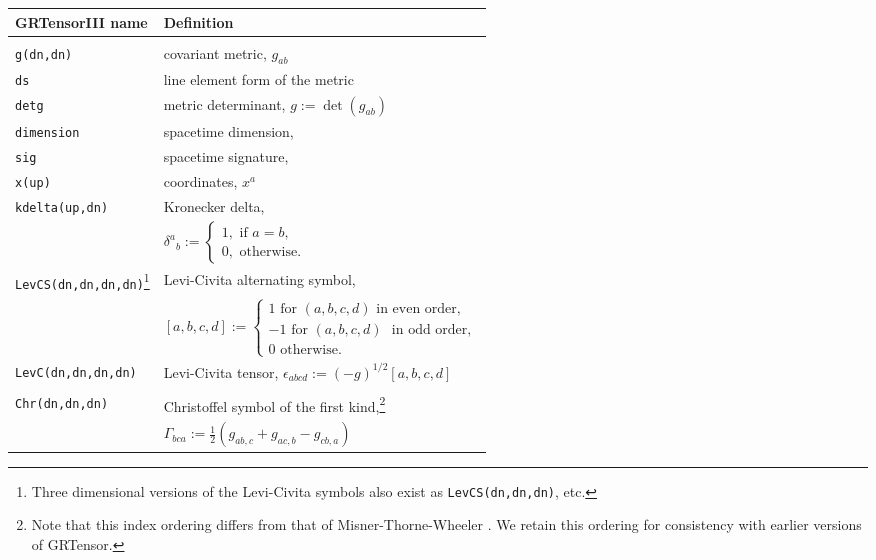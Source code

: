 \documentclass{article}
\begin{document}
{{{\renewcommand{\baselinestretch}{1.5}\normalsize
\begin{longtable}[c]{lp{}}\hline\hline
GRTensorIII name & Definition\\ \hline
& \\
\texttt{g(dn,dn)}	& covariant metric, $g_{ab}$\\
\texttt{ds}		& line element form of the metric\\
\texttt{detg}		& metric determinant, $g := \det (g_{ab})$\\
\texttt{dimension}	& spacetime dimension,\\
\texttt{sig}		& spacetime signature,\\
\texttt{x(up)}		& coordinates, $x^a$\\
%
\texttt{kdelta(up,dn)}	& Kronecker delta, \\ 
			& $\delta^a{}_b :=
			    \left\{
			      \begin{array}{l}
			        1, \text{~if~} a=b,\\
			        0, \text{~otherwise.}
			      \end{array}
			    \right. $ \\
\texttt{LevCS(dn,dn,dn,dn)}\footnote{Three dimensional versions of the
Levi-Civita symbols also exist as \texttt{LevCS(dn,dn,dn)}, etc.}
			& Levi-Civita alternating symbol,\\
			& $ [a,b,c,d] :=
			    \left\{
			      \begin{array}{l}
				1 \text{~for~}(a,b,c,d)
				\text{~in even order}, \\
			        -1 \text{~for~} (a,b,c,d)
				\text{~ in odd order},\\
				0 \text{~otherwise.}
			      \end{array}
			    \right. $ \\
\texttt{LevC(dn,dn,dn,dn)} & Levi-Civita tensor, 
			$\epsilon_{abcd} := (-g)^{1/2}[a,b,c,d]$\\
& \\
%
\texttt{Chr(dn,dn,dn)}	& Christoffel symbol of the first 
			  kind,\footnote{
			  \parbox[t]{\textwidth}{
			  \renewcommand{\baselinestretch}{1}\small
			  Note that this index ordering
			  differs from that of Misner-Thorne-Wheeler
			  \cite{mtw}. 
			  We retain this ordering for 
			  consistency with earlier versions of GRTensor.
			  \renewcommand{\baselinestretch}{1}\normalsize}}\\
			& $ \Gamma_{bca} := \frac{1}{2}(g_{ab,c} + g_{ac,b} -
			     g_{cb,a})$\\

\end{longtable}}}}
\end{document}
